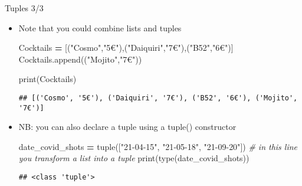 \documentclass[
  8pt,
  ignorenonframetext,
]{beamer}
\newenvironment{Shaded}{\begin{snugshade}}{\end{snugshade}}
\newcommand{\BuiltInTok}[1]{#1}
\newcommand{\CommentTok}[1]{\textcolor[rgb]{0.56,0.35,0.01}{\textit{#1}}}
\newcommand{\NormalTok}[1]{#1}
\newcommand{\OperatorTok}[1]{\textcolor[rgb]{0.81,0.36,0.00}{\textbf{#1}}}
\newcommand{\StringTok}[1]{\textcolor[rgb]{0.31,0.60,0.02}{#1}}
\begin{document}
\begin{frame}[fragile]{Tuples 3/3}
\protect\hypertarget{tuples-33}{}
\begin{itemize}[<+->]
\item
  Note that you could combine lists and tuples

\begin{Shaded}
\begin{Highlighting}[]
\NormalTok{Cocktails }\OperatorTok{=}\NormalTok{ [(}\StringTok{"Cosmo"}\NormalTok{,}\StringTok{"5€"}\NormalTok{),(}\StringTok{"Daiquiri"}\NormalTok{,}\StringTok{"7€"}\NormalTok{),(}\StringTok{"B52"}\NormalTok{,}\StringTok{"6€"}\NormalTok{)]}
\NormalTok{Cocktails.append((}\StringTok{"Mojito"}\NormalTok{,}\StringTok{"7€"}\NormalTok{))}

\BuiltInTok{print}\NormalTok{(Cocktails)}
\end{Highlighting}
\end{Shaded}

\begin{verbatim}
## [('Cosmo', '5€'), ('Daiquiri', '7€'), ('B52', '6€'), ('Mojito', '7€')]
\end{verbatim}
\end{itemize}

\begin{itemize}[<+->]
\item
  NB: you can also declare a tuple using a tuple() constructor

\begin{Shaded}
\begin{Highlighting}[]
\NormalTok{date\_covid\_shots }\OperatorTok{=} \BuiltInTok{tuple}\NormalTok{([}\StringTok{"21{-}04{-}15"}\NormalTok{, }\StringTok{"21{-}05{-}18"}\NormalTok{, }\StringTok{"21{-}09{-}20"}\NormalTok{])}
\CommentTok{\# in this line you transform a list into a tuple}
\BuiltInTok{print}\NormalTok{(}\BuiltInTok{type}\NormalTok{(date\_covid\_shots))}
\end{Highlighting}
\end{Shaded}

\begin{verbatim}
## <class 'tuple'>
\end{verbatim}
\end{itemize}
\end{frame}
\end{document}
